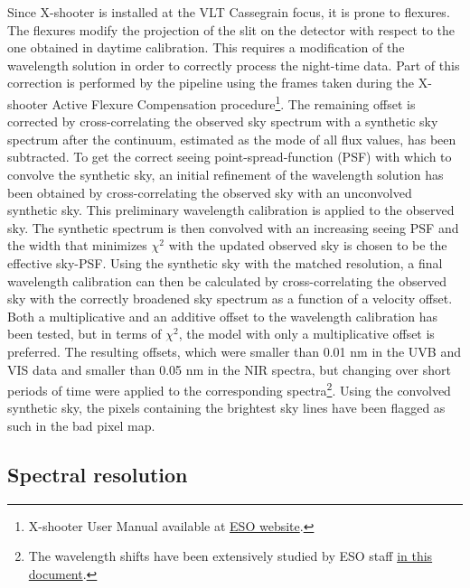 \documentclass[longauth]{aa}    %
\begin{document}
Since X-shooter is installed at the VLT Cassegrain focus, it is prone to
flexures. The flexures modify the projection of the slit on the detector with
respect to the one obtained in daytime calibration. This requires a modification
of the wavelength solution in order to correctly process the night-time data.
Part of this correction is performed by the pipeline using the frames taken
during the X-shooter Active Flexure Compensation procedure\footnote{X-shooter
	User Manual available at
	\href{https://www.eso.org/sci/facilities/paranal/instruments/xshooter/doc.html}{ESO website}.}. The remaining offset is corrected by cross-correlating the observed sky spectrum with a synthetic sky spectrum \citep{Noll2012, Jones2013} after the continuum, estimated as the mode of all flux values, has been subtracted. To get the correct seeing point-spread-function (PSF) with which to convolve the synthetic sky, an initial refinement of the wavelength solution has been obtained by cross-correlating the observed sky with an unconvolved synthetic sky. This preliminary wavelength calibration is applied to the observed sky. The synthetic spectrum is then convolved with an increasing seeing PSF and the width that minimizes $\chi^2$ with the updated observed sky is chosen to be the effective sky-PSF. Using the synthetic sky with the matched resolution, a final wavelength calibration can then be calculated by cross-correlating the observed sky with the correctly broadened sky spectrum as a function of a velocity offset. Both a multiplicative and an additive offset to the wavelength calibration has been tested, but in terms of $\chi^2$, the model with only a multiplicative offset is preferred. The resulting offsets, which were smaller than 0.01 nm in the UVB and VIS data and smaller than 0.05 nm in the NIR spectra, but changing over short periods of time were applied to the corresponding spectra\footnote{The wavelength shifts have been extensively studied by ESO staff \href{https://www.eso.org/sci/facilities/paranal/instruments/xshooter/doc/XS_wlc_shift_150615.pdf}{in this document}.}. Using the convolved synthetic sky, the pixels containing the brightest sky lines have been flagged as such in the bad pixel map.



\subsection{Spectral resolution} \label{resolution}
\end{document}
